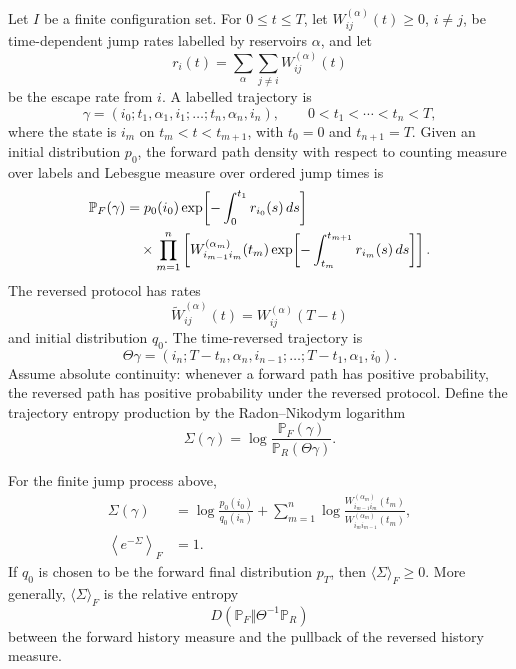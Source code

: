 Let \(I\) be a finite configuration set.  For \(0\leq t\leq T\), let
\(W^{(\alpha)}_{ij}(t)\geq0\), \(i\ne j\), be time-dependent jump rates
labelled by reservoirs \(\alpha\), and let
\[
  r_i(t)=\sum_{\alpha}\sum_{j\ne i}W^{(\alpha)}_{ij}(t)
\]
be the escape rate from \(i\).  A labelled trajectory is
\[
  \gamma=(i_0;t_1,\alpha_1,i_1;\ldots;t_n,\alpha_n,i_n),
  \qquad 0<t_1<\cdots<t_n<T,
\]
where the state is \(i_m\) on \(t_m<t<t_{m+1}\), with
\(t_0=0\) and \(t_{n+1}=T\).  Given an initial distribution \(p_0\), the
forward path density with respect to counting measure over labels and
Lebesgue measure over ordered jump times is
\begin{align}
  \mathbb P_F(\gamma)
  &=
  p_0(i_0)
  \exp\!\left[-\int_{0}^{t_1}r_{i_0}(s)\,ds\right]
  \notag\\
  &\quad\times
  \prod_{m=1}^{n}
  \left[
    W^{(\alpha_m)}_{i_{m-1}i_m}(t_m)
    \exp\!\left[-\int_{t_m}^{t_{m+1}}r_{i_m}(s)\,ds\right]
  \right].
  \label{eq:finite-forward-jump-path-density}
\end{align}
The reversed protocol has rates
\[
  \widetilde W^{(\alpha)}_{ij}(t)=W^{(\alpha)}_{ij}(T-t)
\]
and initial distribution \(q_0\).  The time-reversed trajectory is
\[
  \Theta\gamma
  =
  (i_n;T-t_n,\alpha_n,i_{n-1};\ldots;T-t_1,\alpha_1,i_0).
\]
Assume absolute continuity: whenever a forward path has positive
probability, the reversed path has positive probability under the reversed
protocol.  Define the trajectory entropy production by the
Radon--Nikodym logarithm
\begin{equation}
  \Sigma(\gamma)
  =
  \log
  \frac{\mathbb P_F(\gamma)}
       {\mathbb P_R(\Theta\gamma)} .
  \label{eq:finite-path-entropy-production-rn}
\end{equation}

\begin{proposition}
\label{prop:finite-path-fluctuation-identity}
For the finite jump process above,
\begin{align}
  \Sigma(\gamma)
  &=
  \log\frac{p_0(i_0)}{q_0(i_n)}
  +
  \sum_{m=1}^n
  \log
  \frac{W^{(\alpha_m)}_{i_{m-1}i_m}(t_m)}
       {W^{(\alpha_m)}_{i_m i_{m-1}}(t_m)},
  \label{eq:finite-path-entropy-explicit}\\
  \left\langle e^{-\Sigma}\right\rangle_F&=1 .
  \label{eq:finite-integral-fluctuation-theorem}
\end{align}
If \(q_0\) is chosen to be the forward final distribution \(p_T\), then
\(\langle \Sigma\rangle_F\ge0\).  More generally, \(\langle\Sigma\rangle_F\)
is the relative entropy
\[
  D(\mathbb P_F\Vert \Theta^{-1}\mathbb P_R)
\]
between the forward history measure and the pullback of the reversed history
measure.
\end{proposition}

